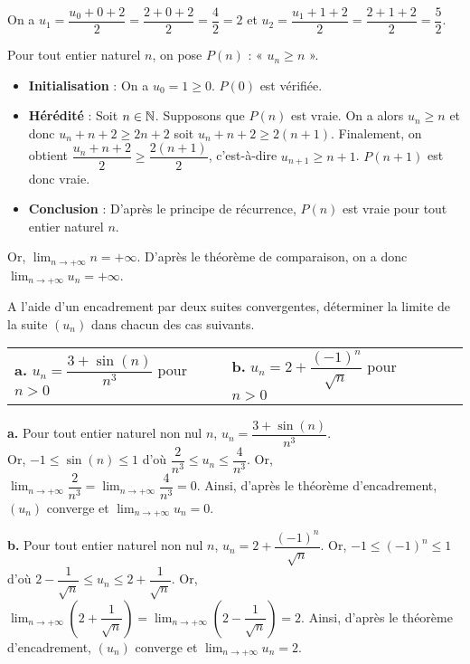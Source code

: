 \documentclass[11pt,fleqn, openany]{book} %
\begin{document}
\begin{solution}
On a $u_1=\dfrac{u_0+0+2}{2}=\dfrac{2+0+2}{2}=\dfrac{4}{2}=2$ et $u_2=\dfrac{u_1+1+2}{2}=\dfrac{2+1+2}{2}=\dfrac{5}{2}$.

Pour tout entier naturel $n$, on pose $P(n)$ : « $u_n \geqslant n$ ».

\begin{itemize}
\item \textbf{Initialisation} : On a $u_0=1 \geqslant 0$. $P(0)$ est vérifiée.
\item \textbf{Hérédité} : Soit $n\in\mathbb{N}$. Supposons que $P(n)$ est vraie. On a alors $u_n \geqslant n$ et donc $u_n + n + 2 \geqslant 2n+2$ soit $u_n+n+2 \geqslant 2(n+1)$. Finalement, on obtient $\dfrac{u_n+n+2}{2} \geqslant \dfrac{2(n+1)}{2}$, c'est-à-dire $u_{n+1}\geqslant n+1$. $P(n+1)$ est donc vraie.
\item \textbf{Conclusion} : D'après le principe de récurrence, $P(n)$ est vraie pour tout entier naturel $n$.
\end{itemize}

Or, $\displaystyle\lim_{n\to+\infty}n=+\infty$. D'après le théorème de comparaison, on a donc $\displaystyle\lim_{n\to+ \infty}u_n=+\infty$.
\newpage
\end{solution}


\begin{exercise}[topic=lim11] A l'aide d'un encadrement par deux suites convergentes, déterminer la limite de la suite $(u_n)$ dans chacun des cas suivants.

\begin{center}
\begin{tabularx}{\linewidth}{XXXX}
\textbf{a.} $ u_n = \dfrac{3+\sin(n)}{n^3}$ pour $n>0$ & \textbf{b.} $u_n=2+\dfrac{(-1)^n}{\sqrt{n}}$ pour $n>0$ \\

\end{tabularx}
\end{center}\end{exercise}

\begin{solution}\textbf{a.} Pour tout entier naturel non nul $n$, $u_n=\dfrac{3+\sin(n)}{n^3}$.\\ Or, $-1 \leqslant \sin(n) \leqslant 1$ d'où $\dfrac{2}{n^3} \leqslant u_n \leqslant \dfrac{4}{n^3}$. Or, $\displaystyle \lim_{n \to +\infty} \dfrac{2}{n^3}=\displaystyle \lim_{n \to +\infty}\dfrac{4}{n^3}=0$. Ainsi, d'après le théorème d'encadrement, $(u_n)$ converge et $\displaystyle \lim_{n \to +\infty}u_n=0$.

\textbf{b.} Pour tout entier naturel non nul $n$, $u_n=2+\dfrac{(-1)^n}{\sqrt{n}}$. Or, $-1 \leqslant (-1)^n \leqslant 1$ d'où $2-\dfrac{1}{\sqrt{n}} \leqslant u_n \leqslant 2+\dfrac{1}{\sqrt{n}}$. Or, $\displaystyle \lim_{n \to +\infty}\left( 2+\dfrac{1}{\sqrt{n}}\right)=\displaystyle \lim_{n \to +\infty}\left( 2-\dfrac{1}{\sqrt{n}}\right)=2$. Ainsi, d'après le théorème d'encadrement, $(u_n)$ converge et $\displaystyle \lim_{n \to +\infty}u_n=2$.\end{solution}
\end{document}
